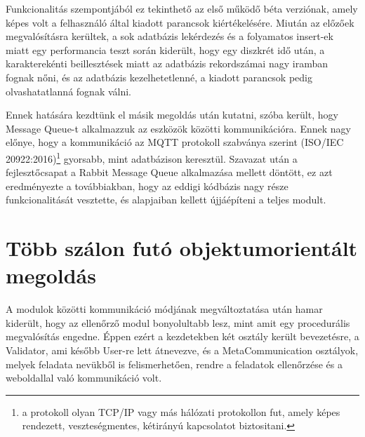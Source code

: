 \documentclass[12pt]{report}
\begin{document}
Funkcionalitás szempontjából ez tekinthető az első működő béta verziónak, amely képes volt a felhasználó által kiadott parancsok kiértékelésére.
Miután az előzőek megvalósításra kerültek, a sok adatbázis lekérdezés és a folyamatos insert-ek miatt egy performancia teszt során kiderült, hogy egy diszkrét idő után, a karakterekénti beillesztések miatt az adatbázis rekordszámai nagy iramban fognak nőni, és az adatbázis kezelhetetlenné, a kiadott parancsok pedig olvashatatlanná fognak válni.

Ennek hatására kezdtünk el másik megoldás után kutatni, szóba került, hogy Message Queue-t alkalmazzuk az eszközök közötti kommunikációra. Ennek nagy előnye, hogy a kommunikáció az MQTT protokoll szabványa szerint (ISO/IEC 20922:2016)\footnote{a protokoll olyan TCP/IP vagy más hálózati protokollon fut, amely képes rendezett, veszteségmentes, kétirányú kapcsolatot biztositani.} gyorsabb, mint adatbázison keresztül.
Szavazat után a fejlesztőcsapat a Rabbit Message Queue alkalmazása mellett döntött, ez azt eredményezte a továbbiakban, hogy az eddigi kódbázis nagy része funkcionalitását vesztette, és alapjaiban kellett újjáépíteni a teljes modult.


\section{Több szálon futó objektumorientált megoldás}


A modulok közötti kommunikáció módjának megváltoztatása után hamar kiderült, hogy az ellenőrző modul bonyolultabb lesz, mint amit egy procedurális megvalósítás engedne. Éppen ezért a kezdetekben két osztály került bevezetésre, a Validator, ami később User-re lett átnevezve, és a MetaCommunication osztályok, melyek feladata nevükből is felismerhetően, rendre a feladatok ellenőrzése és a weboldallal való kommunikáció volt.
\end{document}
